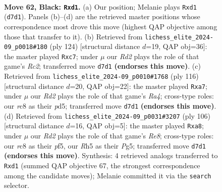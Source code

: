 \documentclass[11pt]{article}
\begin{document}
\clearpage

\begin{figure}[p]\centering
\begin{subfigure}{0.46\textwidth}\centering
\resizebox{\linewidth}{!}{%
\newchessgame
\chessboard[
  setfen={2R5/3r2k1/8/p6r/5K2/1P6/7P/3R4 b - - 0 62},
  showmover=false,
  pgfstyle=straightmove, color=movearrow, markmove={d7-d1}
]}
\caption{}
\end{subfigure}\hfill
\begin{subfigure}{0.46\textwidth}\centering
\resizebox{\linewidth}{!}{%
\newchessgame
\chessboard[
  setfen={3R4/2r5/1r4p1/8/7k/8/2R3K1/8 w - - 0 63},
  showmover=false,
  pgfstyle=straightmove, color=movearrow, markmove={c2-c7}
]}
\caption{}
\end{subfigure}
\\[4pt]
\begin{subfigure}{0.46\textwidth}\centering
\resizebox{\linewidth}{!}{%
\newchessgame
\chessboard[
  setfen={8/r7/1k3p2/3p4/R2K2P1/8/8/8 w - - 0 59},
  showmover=false,
  pgfstyle=straightmove, color=movearrow, markmove={a4-a7}
]}
\caption{}
\end{subfigure}\hfill
\begin{subfigure}{0.46\textwidth}\centering
\resizebox{\linewidth}{!}{%
\newchessgame
\chessboard[
  setfen={r3R3/3k3p/7P/5pP1/8/8/4K3/8 w - - 0 54},
  showmover=false,
  pgfstyle=straightmove, color=movearrow, markmove={e8-a8}
]}
\caption{}
\end{subfigure}
\caption{\textbf{Move 62, Black: \texttt{Rxd1}.} (a) Our position; Melanie plays \texttt{Rxd1} (\texttt{d7d1}). Panels (b)--(d) are the retrieved master positions whose correspondence most drove this move (highest QAP objective among those that transfer to it). (b) Retrieved from \texttt{lichess\_elite\_2024-09\_p0018\#180} (ply 124) [structural distance $d$=19, QAP obj=36]: the master played \texttt{Rxc7}; under $\mu$ our \emph{Rd2} plays the role of that game's \emph{Rc2}; transferred move \texttt{d7d1} \textbf{(endorses this move)}. (c) Retrieved from \texttt{lichess\_elite\_2024-09\_p0010\#1768} (ply 116) [structural distance $d$=20, QAP obj=22]: the master played \texttt{Rxa7}; under $\mu$ our \emph{Rd2} plays the role of that game's \emph{Ra4}; cross-type roles: our \emph{r}c8 as their \emph{p}d5; transferred move \texttt{d7d1} \textbf{(endorses this move)}. (d) Retrieved from \texttt{lichess\_elite\_2024-09\_p0031\#3207} (ply 106) [structural distance $d$=16, QAP obj=5]: the master played \texttt{Rxa8}; under $\mu$ our \emph{Rd2} plays the role of that game's \emph{Re8}; cross-type roles: our \emph{r}c8 as their \emph{p}f5, our \emph{R}h5 as their \emph{P}g5; transferred move \texttt{d7d1} \textbf{(endorses this move)}. Synthesis: 4 retrieved analogs transferred to \texttt{Rxd1} (summed QAP objective 67, the strongest correspondence among the candidate moves); Melanie committed it via the \texttt{search} selector.}
\label{fig:thought-m123}
\end{figure}
\end{document}
